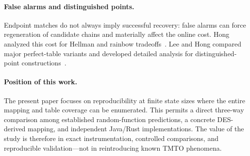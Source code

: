 \paragraph{False alarms and distinguished points.}
Endpoint matches do not always imply successful recovery: false alarms can
force regeneration of candidate chains and materially affect the online cost.
Hong analyzed this cost for Hellman and rainbow tradeoffs~\cite{Hong2008}.
Lee and Hong compared major perfect-table variants and developed detailed
analysis for distinguished-point constructions~\cite{LeeHong2012}.

\paragraph{Position of this work.}
The present paper focuses on reproducibility at finite state sizes where the
entire mapping and table coverage can be enumerated.  This permits a direct
three-way comparison among established random-function predictions, a concrete
DES-derived mapping, and independent Java/Rust implementations.  The value of
the study is therefore in exact instrumentation, controlled comparisons, and
reproducible validation---not in reintroducing known TMTO phenomena.
